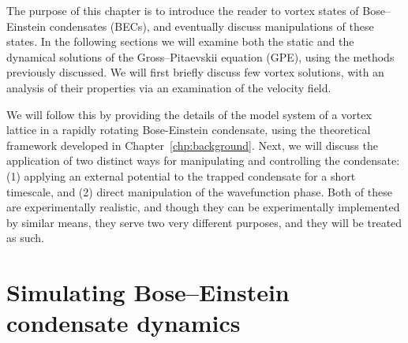 The purpose of this chapter is to introduce the reader to vortex states of Bose--Einstein condensates (BECs), and eventually discuss manipulations of these states. In the following sections we will examine both the static and the dynamical solutions of the Gross--Pitaevskii equation (GPE), using the methods previously discussed. We will first briefly discuss few vortex solutions, with an analysis of their properties via an examination of the velocity field.

We will follow this by providing the details of the model system of a vortex lattice in a rapidly rotating Bose-Einstein condensate, using the theoretical framework developed in Chapter~\ref{chp:background}. Next, we will discuss the application of two distinct ways for manipulating and controlling the condensate: (1) applying an external potential to the trapped condensate for a short timescale, and (2) direct manipulation of the wavefunction phase. Both of these are experimentally realistic, and though they can be experimentally implemented by similar means, they serve two very different purposes, and they will be treated as such.

\section{Simulating Bose--Einstein condensate dynamics}

